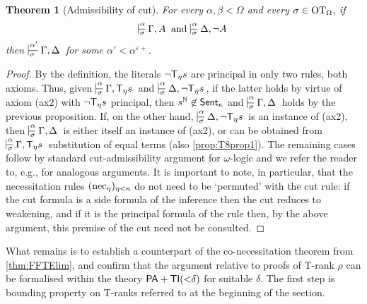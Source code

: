\documentclass[UKenglish,cleveref,DIV=12]{scrartcl}
\newtheorem{theorem}{Theorem}
\theoremstyle{definition}
\theoremstyle{definition}
\begin{document}
\begin{theorem}[Admissibility of cut]\label{thm:T8CutElim}%
	For every $\alpha,\beta<\Omega$ and every $\sigma\in\mathrm{OT}_\Omega$, if\/ 
	\[\prov{\alpha}{\sigma} {\Gamma,A} \text{ and } \prov{\alpha}{\sigma} {\Delta,\lnot A}
	\] then $\prov{\alpha'}\sigma{\Gamma,\Delta}$ for some $\alpha' <\alpha^{\varepsilon+}$.
\end{theorem}
\begin{proof}
By the definition, the literals \( \lnot \mathsf{T}_\eta s \) are principal in only two rules, both axioms.
Thus, given $\prov{\alpha}{\sigma}{\Gamma ,\T_\eta s}$ and $\prov{\alpha}{\sigma}{\Delta,\lnot \T_\eta s}$, if the latter holds by virtue of axiom (ax2) with $\lnot \mathsf{T}_\eta s$ principal, then \( s^\mathbb N \not\in \mathsf{Sent}_\kappa \) and \( \prov \alpha \sigma {\Gamma , \Delta} \) holds by the previous proposition.
If, on the other hand, $\prov{\alpha}{\sigma}{\Delta,\lnot \T_\eta s}$ is an instance of (ax2), then \( \prov \alpha \sigma {\Gamma , \Delta} \) is either itself an instance of (ax2), or can be obtained from \( \prov \alpha \sigma {\Gamma , \T_\eta s} \) substitution of equal terms (also \cref{prop:T8prop1}).
%
The remaining cases follow by standard cut-admissibility argument for \( \omega \)-logic and we refer the reader to, e.g., \cite{LeiRat10,Lei-thesis} for analogous arguments.
It is important to note, in particular, that the necessitation rules \( (\textrm{nec$_{\eta}$})_{\eta < \kappa} \) do not need to be `permuted' with the cut rule: if the cut formula is a side formula of the inference then the cut reduces to weakening, and if it is the principal formula of the rule then, by the above argument, this premise of the cut need  not be consulted.
\end{proof}

What remains is to establish a counterpart of the co-necessitation theorem from
\cref{thm:FFTElim}, and confirm that the argument relative to proofs of T-rank \( \rho \) can be formalised
within the theory $\mathsf{PA}+\mathsf{TI}({<}\delta)$ for suitable $\delta$. 
The first step is bounding property on T-ranks referred to at the beginning of the section.
\end{document}
